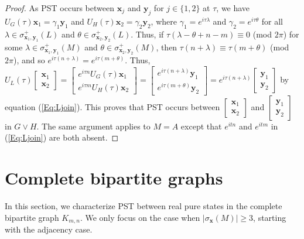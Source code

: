 \documentclass[11pt]{article}
\newcommand{\bx}{\mathbf x}
\newcommand{\by}{\mathbf y}
\begin{document}
\begin{proof}
As PST occurs between $\bx_j$ and $\by_j$ for $j\in\{1,2\}$ at $\tau$, we have $U_G(\tau)\bx_1=\gamma_1\by_1$ and $U_H(\tau)\bx_2=\gamma_2\by_2$, where $\gamma_1=e^{i\tau\lambda}$ and $\gamma_2=e^{i\tau\theta}$ for all $\lambda\in\sigma_{\bx_1,\by_1}^+(L)$ and $\theta\in\sigma_{\bx_2,\by_2}^+(L)$. Thus, if $\tau(\lambda-\theta+n-m)\equiv 0$ (mod $2\pi$) for some $\lambda\in\sigma_{\bx_1,\by_1}^+(M)$ and $\theta\in\sigma_{\bx_2,\by_2}^+(M)$, then $\tau(n+\lambda)\equiv \tau(m+\theta)$ (mod $2\pi$), and so $e^{i\tau (n+\lambda)}=e^{i\tau (m+\theta)}$. Thus, $U_{L}(\tau)\left[\begin{array}{cc} \bx_1 \\ \bx_2\end{array} \right]=\left[\begin{array}{cc} e^{i\tau n}U_G(\tau)\bx_1 \\ e^{i\tau m}U_H(\tau)\bx_2\end{array} \right]=\left[\begin{array}{cc} e^{i\tau (n+\lambda)}\by_1 \\ e^{i\tau (m+\theta)}\by_2\end{array} \right]=e^{i\tau(n+\lambda)}\left[\begin{array}{cc}\by_1 \\ \by_2\end{array} \right]$ by equation (\ref{Eq:Ljoin}). This proves that PST occurs between $\left[ \begin{array}{cc} \bx_1 \\ \bx_2\end{array} \right]$ and $\left[ \begin{array}{cc} \by_1 \\ \by_2\end{array} \right]$ in $G\vee H$. The same argument applies to $M=A$ except that $e^{itn}$ and $e^{itm}$ in (\ref{Eq:Ljoin}) are both absent.
\end{proof}


\section{Complete bipartite graphs}\label{Sec:cbp}

In this section, we characterize PST between real pure states in the complete bipartite graph $K_{m,n}$. We only focus on the case when $|\sigma_{\bx}(M)|\geq 3$, starting with the adjacency case.
\end{document}
